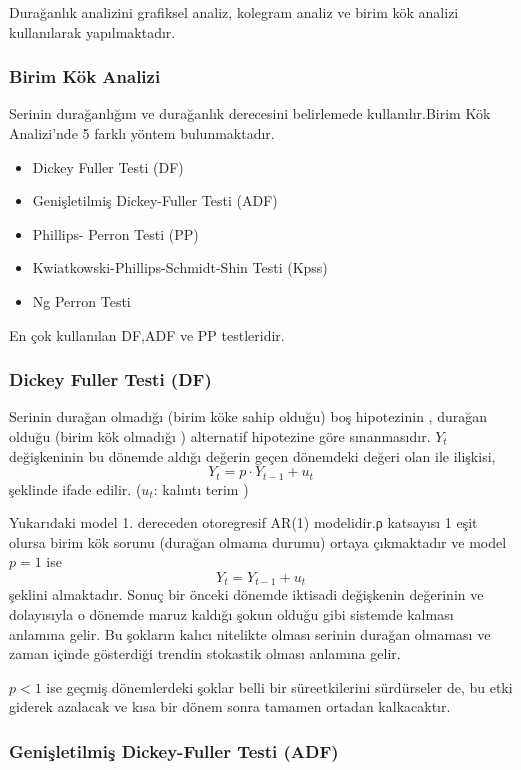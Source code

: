 \documentclass[11pt]{article}
\providecommand{\tightlist}{%
      \setlength{\itemsep}{0pt}\setlength{\parskip}{0pt}}
\begin{document}
Durağanlık analizini grafiksel analiz, kolegram analiz ve birim kök
analizi kullanılarak yapılmaktadır.

\subsubsection{Birim Kök Analizi}\label{birim-kuxf6k-analizi}

Serinin durağanlığını ve durağanlık derecesini belirlemede
kullanılır.Birim Kök Analizi'nde 5 farklı yöntem bulunmaktadır.

\begin{itemize}
\tightlist
\item
  Dickey Fuller Testi (DF)
\item
  Genişletilmiş Dickey-Fuller Testi (ADF)
\item
  Phillips- Perron Testi (PP)
\item
  Kwiatkowski-Phillips-Schmidt-Shin Testi (Kpss)
\item
  Ng Perron Testi
\end{itemize}

En çok kullanılan DF,ADF ve PP testleridir.

\subsubsection{Dickey Fuller Testi (DF)}\label{dickey-fuller-testi-df}

Serinin durağan olmadığı (birim köke sahip olduğu) boş hipotezinin ,
durağan olduğu (birim kök olmadığı ) alternatif hipotezine göre
sınanmasıdır. \(Y_{t}\) değişkeninin bu dönemde aldığı değerin geçen
dönemdeki değeri olan ile ilişkisi, \[ Y_{t}=p\cdot Y_{t-1} + u_{t}\]
şeklinde ifade edilir. (\(u_{t}\): kalıntı terim )

Yukarıdaki model 1. dereceden otoregresif AR(1) modelidir.ρ katsayısı 1
eşit olursa birim kök sorunu (durağan olmama durumu) ortaya çıkmaktadır
ve model \(p=1\) ise \[ Y_{t}=Y_{t-1} + u_{t} \] şeklini almaktadır.
Sonuç bir önceki dönemde iktisadi değişkenin değerinin ve dolayısıyla o
dönemde maruz kaldığı şokun olduğu gibi sistemde kalması anlamına gelir.
Bu şokların kalıcı nitelikte olması serinin durağan olmaması ve zaman
içinde gösterdiği trendin stokastik olması anlamına gelir.

\(p<1\) ise geçmiş dönemlerdeki şoklar belli bir süreetkilerini
sürdürseler de, bu etki giderek azalacak ve kısa bir dönem sonra tamamen
ortadan kalkacaktır.

\subsubsection{Genişletilmiş Dickey-Fuller Testi
(ADF)}\label{geniux15fletilmiux15f-dickey-fuller-testi-adf}
\end{document}
